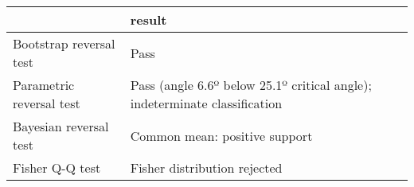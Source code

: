 \begin{tabular}{ll}
\toprule
{} &                                                                      result \\
\midrule
Bootstrap reversal test  &                                                                        Pass \\
Parametric reversal test &  Pass (angle 6.6º below 25.1º critical angle); indeterminate classification \\
Bayesian reversal test   &                                               Common mean: positive support \\
Fisher Q-Q test          &                                                Fisher distribution rejected \\
\bottomrule
\end{tabular}
